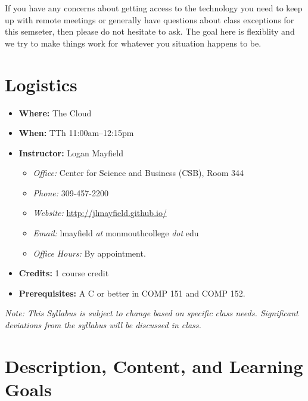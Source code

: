 \documentclass[10pt]{article}
\begin{document}
If you have any concerns about getting access to the technology you need to keep up with
remote meetings or generally have questions about class exceptions for this semseter,
then please do not hesitate to ask. The goal here is flexiblity and we try to make
things work for whatever you situation happens to be.



\section{Logistics}
\begin{itemize}
\item \textbf{Where: } The Cloud
\item \textbf{When: } TTh 11:00am--12:15pm
\item \textbf{Instructor: } Logan Mayfield
\begin{itemize}
\item \textit{Office: } Center for Science and Business (CSB), Room 344\footnotemark[1]
\item \textit{Phone: } 309-457-2200 %
\item \textit{Website: } \url{http://jlmayfield.github.io/}
\item \textit{Email: } lmayfield \textit{at} monmouthcollege \textit{dot} edu
\item \textit{Office Hours: }  By appointment.
\end{itemize}
\item \textbf{Credits: } 1 course credit
\item \textbf{Prerequisites: } A C or better in COMP 151 and COMP 152.
\end{itemize}
\emph{Note: This Syllabus is subject to change based on specific class needs. Significant deviations from the syllabus will be discussed in class.}


\section{Description, Content, and Learning Goals}
\end{document}
